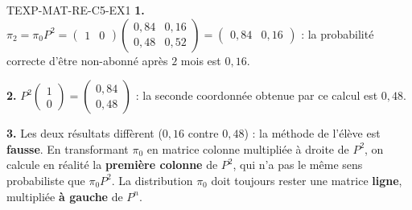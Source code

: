 \begin{corrige}{TEXP-MAT-RE-C5-EX1}
\textbf{1.} $\pi_2=\pi_0P^2=\begin{pmatrix}1&0\end{pmatrix}\begin{pmatrix}0{,}84&0{,}16\\0{,}48&0{,}52\end{pmatrix}=\begin{pmatrix}0{,}84&0{,}16\end{pmatrix}$ : la probabilité correcte d'être non-abonné après $2$ mois est $0{,}16$.

\textbf{2.} $P^2\begin{pmatrix}1\\0\end{pmatrix}=\begin{pmatrix}0{,}84\\0{,}48\end{pmatrix}$ : la seconde coordonnée obtenue par ce calcul est $0{,}48$.

\textbf{3.} Les deux résultats diffèrent ($0{,}16$ contre $0{,}48$) : la méthode de l'élève est \textbf{fausse}. En transformant $\pi_0$ en matrice colonne multipliée à droite de $P^2$, on calcule en réalité la \textbf{première colonne} de $P^2$, qui n'a pas le même sens probabiliste que $\pi_0P^2$. La distribution $\pi_0$ doit toujours rester une matrice \textbf{ligne}, multipliée \textbf{à gauche} de $P^n$.
\end{corrige}
